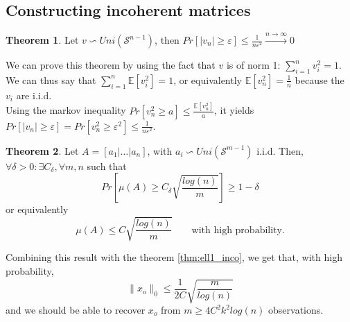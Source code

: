 \documentclass[12pt, openany]{report}
\theoremstyle{definition}
\newtheorem{thm}{Theorem}[chapter]
\begin{document}
\subsection{Constructing incoherent matrices}
\begin{thm}
	Let $v \backsim Uni(\mathcal{S}^{n-1})$, then $Pr[|v_n| \geq \varepsilon] \leq \frac{1}{n \varepsilon^2} \xrightarrow{n \to \infty} 0$
\end{thm}
We can prove this theorem by using the fact that $v$ is of norm 1: $\sum_{i=1}^{n} v_i^2 = 1$.\\
We can thus say that $\sum_{i=1}^{n} \mathbb{E}[v_i^2] = 1$, or equivalently $\mathbb{E}[v_n^2] = \frac{1}{n}$ because the $v_i$ are i.i.d.\\
Using the markov inequality $Pr[v_n^2 \geq a] \leq \frac{\mathbb{E}[v_n^2]}{a}$, it yields $Pr[|v_n| \geq \varepsilon] = Pr[v_n^2 \geq \varepsilon^2] \leq \frac{1}{n \varepsilon^2}$.\\
\begin{thm}
	Let $A = [a_1 | \dots | a_n]$, with $a_i \backsim Uni(\mathcal{S}^{m-1})$ i.i.d. Then, $\forall \delta > 0: \exists C_\delta, \forall m,n$ such that 
	\begin{equation}
		Pr\left[\mu(A) \geq C_\delta \sqrt{\frac{log(n)}{m}}\right] \geq 1 - \delta
	\end{equation}
	or equivalently 
	\begin{equation}
		\mu(A) \leq C \sqrt{\frac{log(n)}{m}} \qquad \text{with high probability.}
	\end{equation}
\end{thm}
Combining this result with the theorem \ref{thm:ell1_inco}, we get that, with high probability,
\begin{equation}
	\|x_o\|_0 \leq \frac{1}{2C} \sqrt{\frac{m}{log(n)}} 
\end{equation}
and we should be able to recover $x_o$ from $m \geq 4C^2k^2log(n)$ observations.
\end{document}
